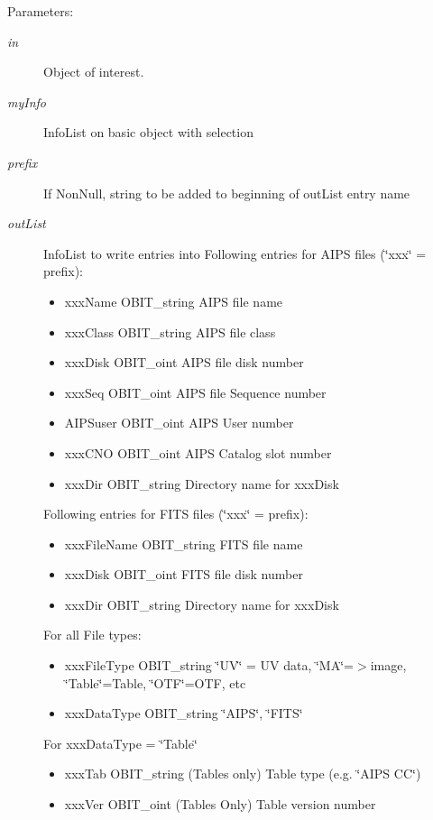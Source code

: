 \begin{Desc}
\item[Parameters:]
\begin{description}
\item[{\em in}]Object of interest. \item[{\em my\-Info}]Info\-List on basic object with selection \item[{\em prefix}]If Non\-Null, string to be added to beginning of out\-List entry name \item[{\em out\-List}]Info\-List to write entries into Following entries for AIPS files (\char`\"{}xxx\char`\"{} = prefix): \begin{itemize}
\item xxx\-Name OBIT\_\-string AIPS file name \item xxx\-Class OBIT\_\-string AIPS file class \item xxx\-Disk OBIT\_\-oint AIPS file disk number \item xxx\-Seq OBIT\_\-oint AIPS file Sequence number \item AIPSuser OBIT\_\-oint AIPS User number \item xxx\-CNO OBIT\_\-oint AIPS Catalog slot number \item xxx\-Dir OBIT\_\-string Directory name for xxx\-Disk\end{itemize}
Following entries for FITS files (\char`\"{}xxx\char`\"{} = prefix): \begin{itemize}
\item xxx\-File\-Name OBIT\_\-string FITS file name \item xxx\-Disk OBIT\_\-oint FITS file disk number \item xxx\-Dir OBIT\_\-string Directory name for xxx\-Disk\end{itemize}
For all File types: \begin{itemize}
\item xxx\-File\-Type OBIT\_\-string \char`\"{}UV\char`\"{} = UV data, \char`\"{}MA\char`\"{}=$>$image, \char`\"{}Table\char`\"{}=Table, \char`\"{}OTF\char`\"{}=OTF, etc \item xxx\-Data\-Type OBIT\_\-string \char`\"{}AIPS\char`\"{}, \char`\"{}FITS\char`\"{}\end{itemize}
For xxx\-Data\-Type = \char`\"{}Table\char`\"{} \begin{itemize}
\item xxx\-Tab OBIT\_\-string (Tables only) Table type (e.g. \char`\"{}AIPS CC\char`\"{}) \item xxx\-Ver OBIT\_\-oint (Tables Only) Table version number\end{itemize}

\end{description}
\end{Desc}
